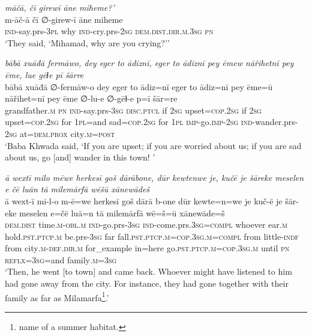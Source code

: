 \ea \label{BP.154}
\textit{māčā, čī girewī āne miheme?’} \\ 
\gll m-āč-ā čī ∅-girew-ī āne miheme \\ 
 \textsc{ind-}say.prs\textsc{-3pl} why \textsc{ind-}cry.prs-\textsc{2sg} \textsc{dem.dist}\textsc{.dir}\textsc{.m}\textsc{.3sg} \textsc{pn} \\ 
\glt `They said, ‘Mihamad, why are you crying?’'
\z 
 
\ea \label{BP.160}
\textit{bābā xuāđā fermāwo, dey eger to ādiznī, eger to ādiznī pey ēmew nāřihetnī pey ēme, lue gēɫe pī šārre} \\ 
\gll bābā xuāđā ∅-fermāw-o dey eger to ādiz=nī eger to ādiz=nī pey ēme=ū nāřihet=nī pey ēme ∅-lu-e ∅-gēɫ-e p=ī šār=re \\ 
 grandfather\textsc{.m} \textsc{pn} \textsc{ind-}say.prs\textsc{-3sg} \textsc{disc.ptcl} if \textsc{2sg} upset\textsc{=cop}\textsc{.\textsc{2sg}} if \textsc{2sg} upset\textsc{=cop}\textsc{.\textsc{2sg}} for \textsc{1pl}=and sad\textsc{=cop}\textsc{.\textsc{2sg}} for \textsc{1pl} \textsc{imp-}go.\textsc{imp-}\textsc{2sg} \textsc{ind-}wander.prs-\textsc{2sg} at=\textsc{dem.prox} city\textsc{.m}\textsc{=\textsc{post}} \\ 
\glt `Baba Khwada said, ‘If you are upset; if you are worried about us; if you are sad about us, go [and] wander in this town! '
\z 
 
\ea \label{BP.167}
\textit{ā wextī milo mēwe herkesī goš dārābone, dūr kewtenwe je, kučē je šāreke meselen e čē luān tā milemārfā wēšū xānewādeš} \\ 
\gll ā wext-ī mi-l-o m-ē=we herkesī goš dārā b-one dūr kewte=n=we je kuč-ē je šār-eke meselen e=čē luā=n tā milemārfā wē=š=ū xānewāde=š \\ 
 \textsc{dem.dist} time\textsc{.m}\textsc{-obl}\textsc{.m} \textsc{ind-}go.prs\textsc{-3sg} \textsc{ind-}come.prs\textsc{.3sg}\textsc{=compl} whoever ear\textsc{.m} hold\textsc{.pst}\textsc{.ptcp}\textsc{.m} be.prs\textsc{-3sg} far fall\textsc{.pst}\textsc{.ptcp}\textsc{.m}\textsc{=cop}\textsc{.3sg}\textsc{.m}\textsc{=compl} from little\textsc{-indf} from city\textsc{.m}\textsc{-def}\textsc{.dir}\textsc{.m} for\_example in=here go\textsc{.pst}\textsc{.ptcp}\textsc{.m}\textsc{=cop}\textsc{.3sg}\textsc{.m} until \textsc{pn} \textsc{reflx}\textsc{=3sg}=and family\textsc{.m}\textsc{=3sg} \\ 
\glt `Then, he went [to town] and came back. Whoever might have listened to him had gone away from the city. For instance, they had gone together with their family as far as Milamarfa\footnote{name of a summer habitat.}.'
\z 
 
